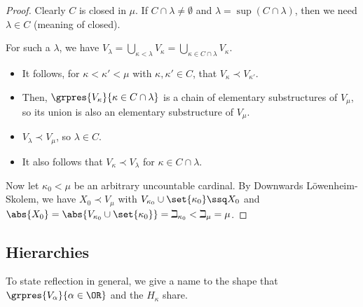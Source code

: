 \begin{proof}
    Clearly $C$ is closed in $\mu$. If $C \cap \lambda \ne \emptyset$ and $\lambda = \sup(C \cap \lambda)$, then we need $\lambda \in C$ (meaning of closed).

    For such a $\lambda$, we have $V_{\lambda} = \bigcup_{\kappa < \lambda} V_{\kappa} = \bigcup_{\kappa \in C \cap \lambda} V_{\kappa}$.

    \begin{itemize}
        \item It follows, for $\kappa < \kappa' < \mu$ with $\kappa, \kappa' \in C$, that $V_{\kappa} \prec V_{\kappa'}$.

        \item Then, $\grpres{V_{\kappa}}{\kappa \in C \cap \lambda}$ is a chain of elementary substructures of $V_{\mu}$, so its union is also an elementary substructure of $V_{\mu}$.

        \item $V_{\lambda} \prec V_{\mu}$, so $\lambda \in C$.

        \item It also follows that $V_{\kappa} \prec V_{\lambda}$ for $\kappa \in C \cap \lambda$.
    \end{itemize}

    Now let $\kappa_0 < \mu$ be an arbitrary uncountable cardinal. By Downwards Löwenheim-Skolem, we have $X_0 \prec V_{\mu}$ with $V_{\kappa_0} \cup \set{\kappa_0} \ssq X_0$ and $\abs{X_0} = \abs{V_{\kappa_0} \cup \set{\kappa_0}} = \beth_{\kappa_0} < \beth_{\mu} = \mu$.

    \sorry
\end{proof}

\subsection{Hierarchies}

To state reflection in general, we give a name to the shape that $\grpres{V_{\alpha}}{\alpha \in \OR}$ and the $H_{\kappa}$ share.

